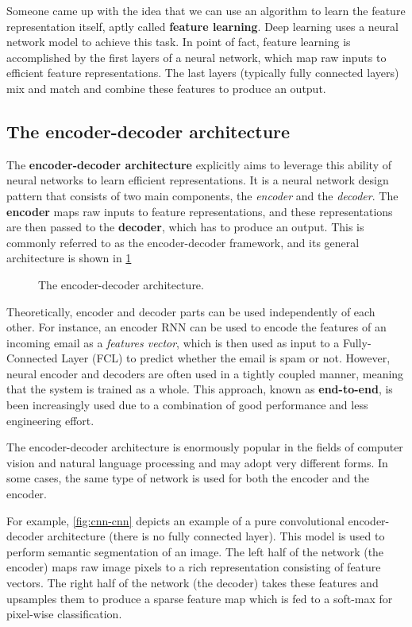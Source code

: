 Someone came up with the idea that we can use an algorithm to learn the feature representation itself, aptly called \textbf{feature learning}. Deep learning uses a neural network model to achieve this task. In point of fact, feature learning is accomplished by the first layers of a neural network, which map raw inputs to efficient feature representations. The last layers (typically fully connected layers) mix and match and combine these features to produce an output.

\subsection{The encoder-decoder architecture}

The \textbf{encoder-decoder architecture} explicitly aims to leverage this ability of neural networks to learn efficient representations. It is a neural network design pattern that consists of two main components, the \textit{encoder} and the \textit{decoder}.  The \textbf{encoder} maps raw inputs to feature representations, and these representations are then passed to the \textbf{decoder}, which has to produce an output. This is commonly referred to as the encoder-decoder framework, and its general architecture is shown in \cref{fig:encoder-decoder}

\begin{figure}[hpt]
    \centering
    
    \caption{The encoder-decoder architecture.}
    \label{fig:encoder-decoder}
\end{figure}

Theoretically, encoder and decoder parts can be used independently of each other. For instance, an encoder RNN can be used to encode the features of an incoming email as a \textit{features vector}, which is then used as input to a Fully-Connected Layer (FCL) to predict whether the email is spam or not. However, neural encoder and decoders are often used in a tightly coupled manner, meaning that the system is trained as a whole. This approach, known as \textbf{end-to-end}, is been increasingly used due to a combination of good performance and less engineering effort.

The encoder-decoder architecture is enormously popular in the fields of computer vision and natural language processing and may adopt very different forms. In some cases, the same type of network is used for both the encoder and the encoder.

For example, \cref{fig:cnn-cnn} depicts an example of a pure convolutional encoder-decoder architecture (there is no fully connected layer). This model is used to perform semantic segmentation of an image. The left half of the network (the encoder) maps raw image pixels to a rich representation consisting of feature vectors. The right half of the network (the decoder) takes these features and upsamples them to produce a sparse feature map which is fed to a soft-max for pixel-wise classification.

